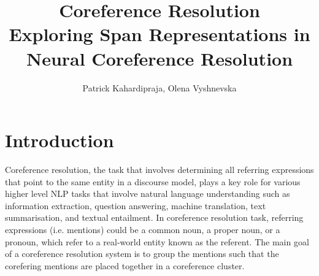 \documentclass[11pt]{article}
\title{{\LARGE Coreference Resolution}\\[1.5mm]
{\large Exploring Span Representations in Neural Coreference Resolution}\\[1.5mm]} %
\author{Patrick Kahardipraja, Olena Vyshnevska}%
\begin{document}
\maketitle


\section{Introduction}










Coreference resolution, the task that involves determining all referring expressions that point to the same entity in a discourse model, plays a key role for various higher level NLP tasks that involve natural language understanding such as information extraction, question answering, machine translation, text summarisation, and textual entailment. In coreference resolution task, referring expressions (i.e. mentions) could be a common noun, a proper noun, or a pronoun, which refer to a real-world entity known as the referent. The main goal of a coreference resolution system is to group the mentions such that the corefering mentions are placed together in a coreference cluster.
\end{document}
